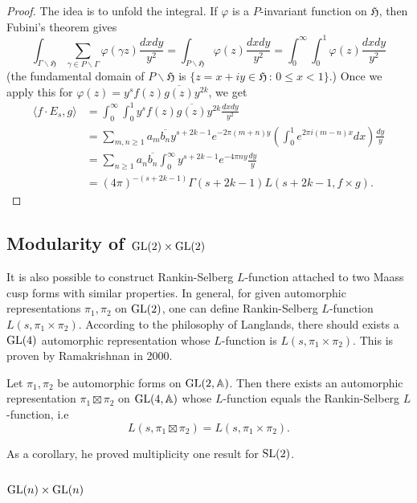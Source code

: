 \begin{proof}
The idea is to unfold the integral.
If $\varphi$ is a $P$-invariant function on $\mathfrak{H}$, then Fubini's theorem gives
$$
\int_{\Gamma\backslash \mathfrak{H}} \sum_{\gamma \in P \backslash \Gamma}\varphi(\gamma z) \frac{dxdy}{y^{2}}
=\int_{P \backslash \mathfrak{H}} \varphi(z) \frac{dxdy}{y^{2}}
= \int_{0}^{\infty} \int_{0}^{1} \varphi(z) \frac{dxdy}{y^{2}}
$$
(the fundamental domain of $P\backslash \mathfrak{H}$ is $\{z = x + iy \in \mathfrak{H}\,:\, 0\leq x < 1\}$.)
Once we apply this for $\varphi(z) = y^{s} f(z)\overline{g(z)}y^{2k}$, we get
\begin{align*}
    \langle f\cdot E_{s}, g\rangle &= \int_{0}^{\infty}\int_{0}^{1} y^{s}f(z)\overline{g(z)} y^{2k} \frac{dxdy}{y^{2}} \\
    &= \sum_{m, n \geq 1} a_{m} \overline{b_{n}}y^{s + 2k - 1} e^{-2\pi(m+n)y}  \left(\int_{0}^{1} e^{2\pi i (m - n)x}dx\right)\frac{dy}{y} \\
    &= \sum_{n\geq 1} a_{n}\overline{b_{n}} \int_{0}^{\infty} y^{s + 2k - 1} e^{-4\pi n y} \frac{dy}{y} \\
    &= (4\pi)^{-(s+2k-1)}\Gamma(s + 2k - 1) L(s+2k-1, f\times g).
\end{align*}
\end{proof}

\subsection{Modularity of $\operatorname{\mathrm{GL}}(2) \times \operatorname{\mathrm{GL}}(2)$}
It is also possible to construct Rankin-Selberg $L$-function attached to two Maass cusp forms with similar properties.
In general, for given automorphic representations $\pi_{1}, \pi_{2}$ on $\operatorname{\mathrm{GL}}(2)$,
one can define Rankin-Selberg $L$-function $L(s, \pi_{1}\times \pi_{2})$.
According to the philosophy of Langlands, there should exists a $\operatorname{\mathrm{GL}}(4)$ automorphic representation whose $L$-function 
is $L(s, \pi_{1}\times \pi_{2})$.
This is proven by Ramakrishnan in 2000.
\begin{theorem}
    Let $\pi_{1}, \pi_{2}$ be automorphic forms on $\operatorname{\mathrm{GL}}(2, \mathbb{A})$.
    Then there exists an automorphic representation $\pi_{1} \boxtimes \pi_{2}$ on $\operatorname{\mathrm{GL}}(4, \mathbb{A})$
    whose $L$-function equals the Rankin-Selberg $L$-function, i.e 
    $$
        L(s, \pi_{1}\boxtimes \pi_{2}) = L(s, \pi_{1} \times \pi_{2}).
    $$
\end{theorem}
As a corollary, he proved multiplicity one result for $\operatorname{\mathrm{SL}}(2)$.
\subsection{$\operatorname{\mathrm{GL}}(n)\times \operatorname{\mathrm{GL}}(n)$}

